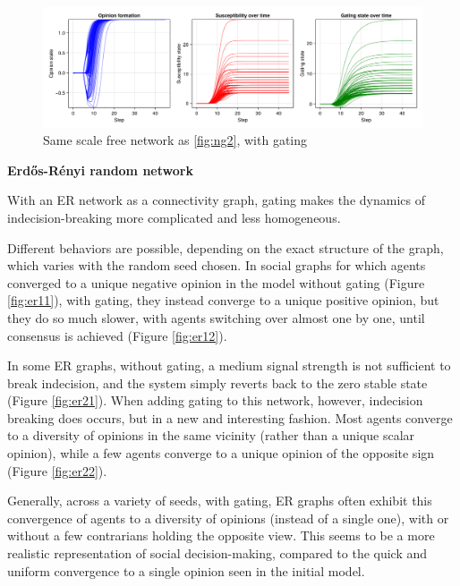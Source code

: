 \documentclass[]{article}
\begin{document}
\begin{figure}
	\centering
	\includegraphics[width=0.7\linewidth]{../plots/nvar0_wg_homd_hisig_g05_BA3_a2_taux5_s92391}
	\caption{Same scale free network as \ref{fig:ng2}, with gating}
	\label{fig:ba}
\end{figure}

\newpage

\textbf{Erdős-Rényi random network}

With an ER network as a connectivity graph, gating makes the dynamics of indecision-breaking more complicated and less homogeneous. 

Different behaviors are possible, depending on the exact structure of the graph, which varies with the random seed chosen. In social graphs for which agents converged to a unique negative opinion in the model without gating (Figure \ref{fig:er11}), with gating, they instead converge to a unique positive opinion, but they do so much slower, with agents switching over almost one by one, until consensus is achieved (Figure \ref{fig:er12}).

In some ER graphs, without gating, a medium signal strength is not sufficient to break indecision, and the system simply reverts back to the zero stable state (Figure \ref{fig:er21}). When adding gating to this network, however, indecision breaking does occurs, but in a new and interesting fashion. Most agents converge to a diversity of opinions in the same vicinity (rather than a unique scalar opinion), while a few agents converge to a unique opinion of the opposite sign (Figure \ref{fig:er22}).

Generally, across a variety of seeds, with gating, ER graphs often exhibit this convergence of agents to a diversity of opinions (instead of a single one), with or without a few contrarians holding the opposite view. This seems to be a more realistic representation of social decision-making, compared to the quick and uniform convergence to a single opinion seen in the initial model.
\end{document}
